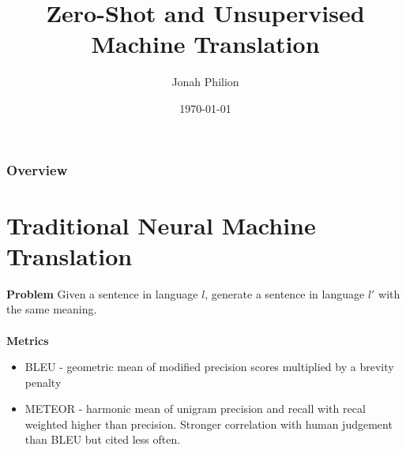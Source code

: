 \documentclass{beamer}
\title[UNMT]{Zero-Shot and Unsupervised Machine Translation} %
\author{Jonah Philion} %
\institute[CS 287] %
{
\medskip
\textit{} %
}
\date{\today} %
\begin{document}
\begin{frame}
\titlepage %
\end{frame}

\begin{frame}
\frametitle{Overview} %
\tableofcontents %
\end{frame}


\section{Traditional Neural Machine Translation} %

\begin{frame}
\textbf{Problem} Given a sentence in language $l$, generate a sentence in language $l'$ with the same meaning.\\\pause
~\\
\textbf{Metrics}
\begin{itemize}
\item BLEU - geometric mean of modified precision scores multiplied by a brevity penalty
\item METEOR - harmonic mean of unigram precision and recall with recal weighted higher than precision. Stronger correlation with human judgement than BLEU but cited less often.
\end{itemize}
\end{frame}

\end{document}
